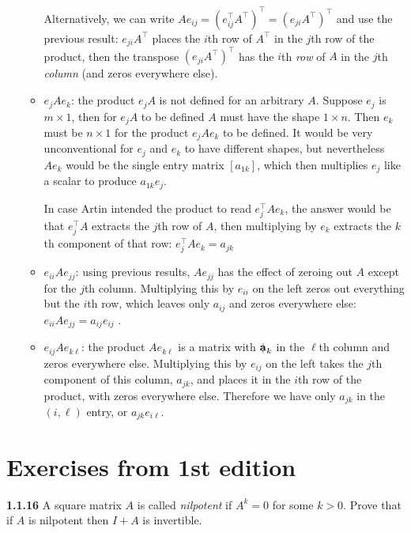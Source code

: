 \documentclass[main.tex]{subfiles}
\begin{document}
\begin{enumerate}[label=1.\arabic*]
\begin{itemize}
Alternatively, we can write $Ae_{ij} = (e_{ij}^\top A^\top)^\top = (e_{ji}A^\top)^\top$ and use the previous
result: $e_{ji}A^\top$ places the $i$th row of $A^\top$ in the $j$th row of the product, then the transpose
$(e_{ji}A^\top)^\top$ has the $i$th \textit{row} of $A$ in the $j$th \textit{column}
(and zeros everywhere else).

\item $e_j A e_k$: the product $e_j A$ is not defined for an arbitrary $A$. Suppose $e_j$ is $m \times 1$, then
for $e_j A$ to be defined $A$ must have the shape $1 \times n$. Then $e_k$ must be $n \times 1$ for the
product $e_j A e_k$ to be defined. It would be very unconventional for $e_j$ and $e_k$ to have different
shapes, but nevertheless $Ae_k$ would be the single entry matrix $[a_{1k}]$, which then multiplies $e_j$
like a scalar to produce $a_{1k} e_j$.

In case Artin intended the product to read $e_j^\top A e_k$, the answer would be that $e_j^\top A$ extracts
the $j$th row of $A$, then multiplying by $e_k$ extracts the $k$th component of that row: $e_j^\top A e_k =
  a_{jk}$

\item $e_{ii}Ae_{jj}$: using previous results, $Ae_{jj}$ has the effect of zeroing out $A$ except for the $j$th
column. Multiplying this by $e_{ii}$ on the left zeros out everything but the $i$th row, which leaves only
$a_{ij}$ and zeros everywhere else: $e_{ii}Ae_{jj} =a_{ij} e_{ij}$ .

\item $e_{ij}Ae_{k\ell}$: the product $Ae_{k\ell}$ is a matrix with $\colvec{a}_k$ in the $\ell$th column and
zeros everywhere else. Multiplying this by $e_{ij}$ on the left takes the $j$th component of this column, $a_{jk}$, and
places it in the $i$th row of the product, with zeros everywhere else. Therefore we have only $a_{jk}$ in the
$(i, \ell)$ entry, or $a_{jk}e_{i\ell}$.
\end{itemize}

\end{enumerate}



\section*{Exercises from 1st edition}

\textbf{1.1.16} A square matrix $A$ is called \textit{nilpotent} if $A^k = 0$ for some $k > 0$. Prove that if $A$ is nilpotent
then $I + A$ is invertible.
\end{document}
